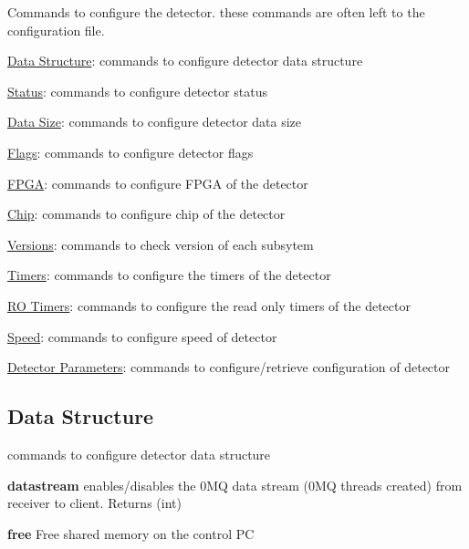 Commands to configure the detector. these commands are often left to the configuration file.
\begin{DoxyItemize}
\item \hyperlink{config_configstructure}{Data Structure}: commands to configure detector data structure
\item \hyperlink{config_configstatus}{Status}: commands to configure detector status
\item \hyperlink{config_configsize}{Data Size}: commands to configure detector data size
\item \hyperlink{config_configflags}{Flags}: commands to configure detector flags
\item \hyperlink{config_configfpga}{FPGA}: commands to configure FPGA of the detector
\item \hyperlink{config_configchip}{Chip}: commands to configure chip of the detector
\item \hyperlink{config_configversions}{Versions}: commands to check version of each subsytem
\item \hyperlink{config_configtimers}{Timers}: commands to configure the timers of the detector
\item \hyperlink{config_configrotimers}{RO Timers}: commands to configure the read only timers of the detector
\item \hyperlink{config_configspeed}{Speed}: commands to configure speed of detector
\item \hyperlink{config_configsettings}{Detector Parameters}: commands to configure/retrieve configuration of detector
\end{DoxyItemize}\hypertarget{config_configstructure}{}\subsection{Data Structure}\label{config_configstructure}
commands to configure detector data structure


\begin{DoxyItemize}
\item {\bfseries  datastream }enables/disables the 0MQ data stream (0MQ threads created) from receiver to client. {\ttfamily Returns} {\ttfamily }(int)
\end{DoxyItemize}


\begin{DoxyItemize}
\item {\bfseries free} Free shared memory on the control PC
\end{DoxyItemize}



